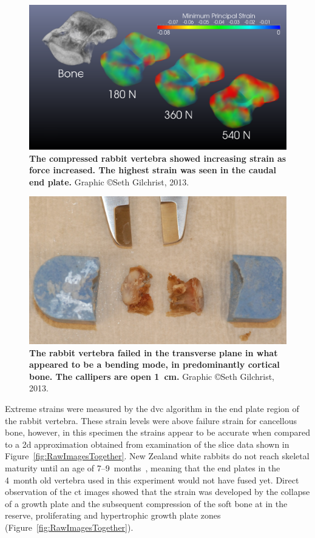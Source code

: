 \begin{figure}
\centering
\includegraphics[width=\linewidth]{./appendixDvc/figures/Comparison3}
\caption[Rabbit vertebra compression]{\textbf{The compressed rabbit vertebra showed increasing strain as force increased. The highest strain was seen in the caudal end plate.} Graphic \copyright Seth Gilchrist, 2013.}
\label{fig:Comparison3}
\end{figure}

\begin{figure}
\centering
\includegraphics[width=.8\linewidth]{./appendixDvc/figures/vertebraPostTest}
\caption[Rabbit vertebra after testing]{\textbf{The rabbit vertebra failed in the transverse plane in what appeared to be a bending mode, in predominantly cortical bone. The callipers are open 1~\ac{cm}.} Graphic \copyright Seth Gilchrist, 2013.}
\label{fig:vertebraPostTest}
\end{figure}

Extreme strains were measured by the \ac{dvc} algorithm in the end plate region of the rabbit vertebra.
These strain levels were above failure strain for cancellous bone, however, in this specimen the strains appear to be accurate when compared to a \ac{2d} approximation obtained from examination of the slice data shown in Figure~\ref{fig:RawImagesTogether}.
New Zealand white rabbits do not reach skeletal maturity until an age of 7--9~months~\citep{masoud_longitudinal_1986}, meaning that the end plates in the 4~month old vertebra used in this experiment would not have fused yet.
Direct observation of the \ac{ct} images showed that the strain was developed by the collapse of a growth plate and the subsequent compression of the soft bone at in the reserve, proliferating and hypertrophic growth plate zones (Figure~\ref{fig:RawImagesTogether}).

